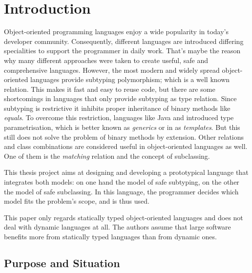 \chapter{Introduction}
Object-oriented programming languages enjoy a wide popularity in today's
developer community. Consequently, different languages are introduced differing
specialities to support the programmer in daily work. That's maybe
the reason why many different approaches were taken to create useful, safe
and comprehensive languages. However, the most modern and widely spread
object-oriented languages provide subtyping polymorphism; which is a well
known relation. This makes
it fast and easy to reuse code, but there are some shortcomings in languages
that only provide subtyping as type relation. Since subtyping
is restrictive it inhibits proper inheritance of binary methods like
\emph{equals}. To overcome this restriction, languages like Java and \cs
introduced type parametrisation, which is better known as \emph{generics}
or in \cpp as \emph{templates}. But this still does not solve the problem
of binary methods by extension. Other relations and class combinations
are considered useful in object-oriented languages as well. One of them
is the \emph{matching} relation and the concept of subclassing.

This thesis project aims at designing and developing a prototypical
language that integrates both models: on one hand the model  of safe
subtyping, on the other the  model of safe subclassing. In this language,
the programmer decides which model fits the problem's scope, and is
thus used.

This paper only regards statically typed object-oriented languages and does
not deal with dynamic languages at all. The authors assume that large
software benefits more from statically typed languages than from dynamic
ones.

\section{Purpose and Situation}
